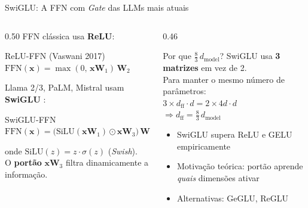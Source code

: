 \documentclass[aspectratio=169, xcolor=dvipsnames]{beamer}
\begin{document}
  \begin{frame}{SwiGLU: A FFN com \textit{Gate} das LLMs mais atuais}
    \begin{columns}[T]
      \begin{column}{0.50\textwidth}
        FFN clássica usa \textbf{ReLU}:
        \begin{block}{ReLU-FFN (Vaswani 2017)}
          $\text{FFN}(\mathbf{x}) = \max(0,\, \mathbf{x}\mathbf{W}_1)\,\mathbf{W}_2$
        \end{block}
        \vspace{0.4em}
        Llama 2/3, PaLM, Mistral usam \textbf{SwiGLU} \cite{shazeer2020swiglu}:
        \begin{block}{SwiGLU-FFN}
          $\text{FFN}(\mathbf{x}) = \bigl(\text{SiLU}(\mathbf{x}\mathbf{W}_1) \odot \mathbf{x}\mathbf{W}_3\bigr)\,\mathbf{W}_2$
        \end{block}
        onde $\text{SiLU}(z) = z \cdot \sigma(z)$ (\textit{Swish}).\\[0.3em]
        O \textbf{portão} $\mathbf{x}\mathbf{W}_3$ filtra dinamicamente a informação.
      \end{column}
      \begin{column}{0.46\textwidth}
        \begin{exampleblock}{Por que $\tfrac{8}{3}\,d_\text{model}$?}
          SwiGLU usa \textbf{3 matrizes} em vez de 2.\\
          Para manter o mesmo número de parâmetros:\\[0.2em]
          $3 \times d_\text{ff} \cdot d = 2 \times 4d \cdot d$\\[0.2em]
          $\Rightarrow d_\text{ff} = \tfrac{8}{3}\,d_\text{model}$
        \end{exampleblock}
        \vspace{0.3em}
        \begin{itemize}
          \item SwiGLU supera ReLU e GELU empiricamente
          \item Motivação teórica: portão aprende \textit{quais} dimensões ativar
          \item Alternativas: GeGLU, ReGLU
        \end{itemize}
      \end{column}
    \end{columns}
  \end{frame}
\end{document}
